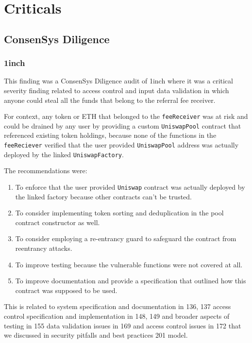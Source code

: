 \section{Criticals}\label{criticals}

\subsection{ConsenSys Diligence}\label{consensys-diligence}

\subsubsection{1inch}\label{inch}

This finding was a ConsenSys Diligence audit of 1inch where it was a
critical severity finding related to access control and input data
validation in which anyone could steal all the funds that belong to the
referral fee receiver.

For context, any token or ETH that belonged to the \texttt{feeReceiver}
was at risk and could be drained by any user by providing a custom
\texttt{UniswapPool} contract that referenced existing token holdings,
because none of the functions in the \texttt{feeReciever} verified that
the user provided \texttt{UniswapPool} address was actually deployed by
the linked \texttt{UniswapFactory}.

The recommendations were:

\begin{enumerate}
\def\labelenumi{\arabic{enumi}.}
\tightlist
\item
  To enforce that the user provided \texttt{Uniswap} contract was
  actually deployed by the linked factory because other contracts can't
  be trusted.
\item
  To consider implementing token sorting and deduplication in the pool
  contract constructor as well.
\item
  To consider employing a re-entrancy guard to safeguard the contract
  from reentrancy attacks.
\item
  To improve testing because the vulnerable functions were not covered
  at all.
\item
  To improve documentation and provide a specification that outlined how
  this contract was supposed to be used.
\end{enumerate}

This is related to system specification and documentation in 136, 137
access control specification and implementation in 148, 149 and broader
aspects of testing in 155 data validation issues in 169 and access
control issues in 172 that we discussed in security pitfalls and best
practices 201 model.

